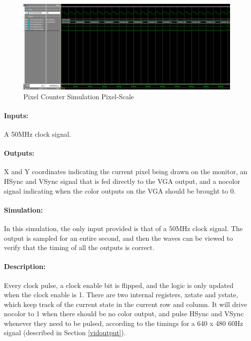 \documentclass[]{article}
\begin{document}
\begin{figure}[H]\centering
    \includegraphics[width=\linewidth]{figures/XYCounter_Sim_Pixels.png}
    \caption{Pixel Counter Simulation Pixel-Scale}
    \label{fig:pixelCounterSimPixels}
\end{figure}
\paragraph{Inputs:} A 50MHz clock signal.
\paragraph{Outputs:} X and Y coordinates indicating the current pixel being drawn on the monitor, an HSync and VSync signal that is fed directly to the VGA output,
and a nocolor signal indicating when the color outputs on the VGA should be brought to 0.
\paragraph{Simulation:} In this simulation, the only input provided is that of a 50MHz clock signal.
The output is sampled for an entire second, and then the waves can be viewed to verify that the timing of all the outputs is correct.
\paragraph{Description:} Every clock pulse, a clock enable bit is flipped, and the logic is only updated when the clock enable is 1.
There are two internal registers, xstate and ystate, which keep track of the current state in the current row and column.
It will drive nocolor to 1 when there should be no color output, and pulse HSync and VSync whenever they need to be pulsed,
according to the timings for a 640 x 480 60Hz signal (described in Section \ref{vidoutput}).
\end{document}
